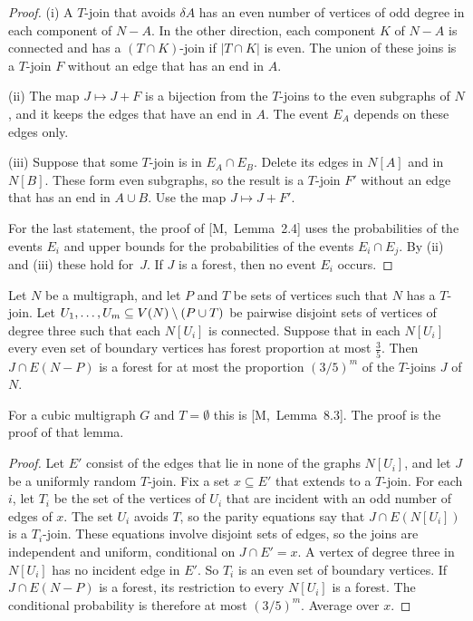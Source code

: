 \documentclass[11pt]{article}
\newcommand{\M}[1]{[M,~#1]}
\begin{document}
\begin{proof}
(i) A $T$-join that avoids $\delta A$ has an even number of vertices of odd degree in each
component of $N-A$. In the other direction, each component $K$ of $N-A$ is connected and has a
$(T\cap K)$-join if $|T\cap K|$ is even. The union of these joins is a $T$-join $F$ without an
edge that has an end in $A$.

(ii) The map $J\mapsto J+F$ is a bijection from the $T$-joins to the even subgraphs of $N$, and
it keeps the edges that have an end in $A$. The event $E_A$ depends on these edges only.

(iii) Suppose that some $T$-join is in $E_A\cap E_B$. Delete its edges in $N[A]$ and in $N[B]$.
These form even subgraphs, so the result is a $T$-join $F'$ without an edge that has an end in
$A\cup B$. Use the map $J\mapsto J+F'$.

For the last statement, the proof of \M{Lemma~2.4} uses the probabilities of the events $E_i$ and
upper bounds for the probabilities of the events $E_i\cap E_j$. By (ii) and (iii) these hold
for~$J$. If $J$ is a forest, then no event $E_i$ occurs.
\end{proof}

\begin{lemma}\label{lem:product}
Let $N$ be a multigraph, and let $P$ and $T$ be sets of vertices such that $N$ has a $T$-join. Let
$U_1,\ldots,U_m\subseteq V(N)\setminus(P\cup T)$ be pairwise disjoint sets of vertices of degree three
such that each $N[U_i]$ is connected. Suppose that in each $N[U_i]$ every even set of boundary
vertices has forest proportion at most $\frac35$. Then $J\cap E(N-P)$ is a forest for at most the
proportion $(3/5)^m$ of the $T$-joins $J$ of $N$.
\end{lemma}

For a cubic multigraph $G$ and $T=\emptyset$ this is \M{Lemma~8.3}. The proof is the proof of
that lemma.

\begin{proof}
Let $E'$ consist of the edges that lie in none of the graphs $N[U_i]$, and let $J$ be a uniformly
random $T$-join. Fix a set $x\subseteq E'$ that extends to a $T$-join. For each $i$, let $T_i$ be
the set of the vertices of $U_i$ that are incident with an odd number of edges of $x$. The set
$U_i$ avoids $T$, so the parity equations say that $J\cap E(N[U_i])$ is a $T_i$-join. These
equations involve disjoint sets of edges, so the joins are independent and uniform, conditional on
$J\cap E'=x$. A vertex of degree three in $N[U_i]$ has no incident edge in $E'$. So $T_i$ is an
even set of boundary vertices. If $J\cap E(N-P)$ is a forest, its restriction to every $N[U_i]$
is a forest. The conditional probability is therefore at most $(3/5)^m$. Average over $x$.
\end{proof}
\end{document}
